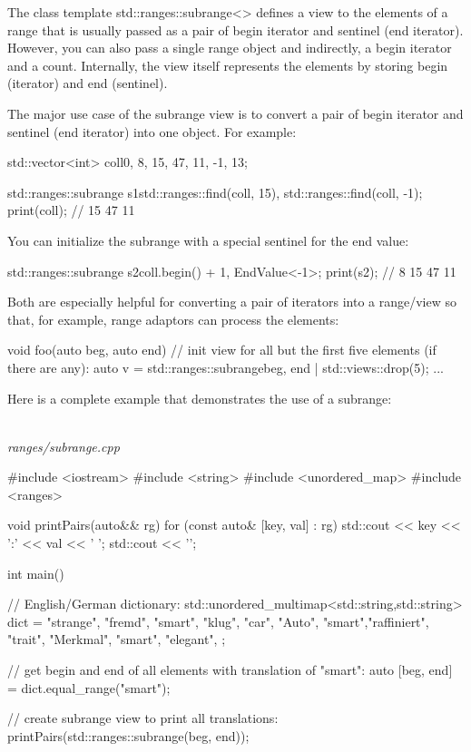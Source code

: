 The class template std::ranges::subrange<> defines a view to the elements of a range that is usually passed as a pair of begin iterator and sentinel (end iterator). However, you can also pass a single range object and indirectly, a begin iterator and a count. Internally, the view itself represents the elements by storing begin (iterator) and end (sentinel).

The major use case of the subrange view is to convert a pair of begin iterator and sentinel (end iterator) into one object. For example:

\begin{cpp}
std::vector<int> coll{0, 8, 15, 47, 11, -1, 13};

std::ranges::subrange s1{std::ranges::find(coll, 15),
						std::ranges::find(coll, -1)};
print(coll); // 15 47 11
\end{cpp}

You can initialize the subrange with a special sentinel for the end value:

\begin{cpp}
std::ranges::subrange s2{coll.begin() + 1, EndValue<-1>{}};
print(s2); // 8 15 47 11
\end{cpp}

Both are especially helpful for converting a pair of iterators into a range/view so that, for example, range adaptors can process the elements:

\begin{cpp}
void foo(auto beg, auto end)
{
	// init view for all but the first five elements (if there are any):
	auto v = std::ranges::subrange{beg, end} | std::views::drop(5);
	...
}
\end{cpp}

Here is a complete example that demonstrates the use of a subrange:

\noindent
\hspace*{\fill} \\ %
\textit{ranges/subrange.cpp}

\begin{cpp}
#include <iostream>
#include <string>
#include <unordered_map>
#include <ranges>

void printPairs(auto&& rg)
{
	for (const auto& [key, val] : rg) {
		std::cout << key << ':' << val << ' ';
	}
	std::cout << '\n';
}

int main()
{
	// English/German dictionary:
	std::unordered_multimap<std::string,std::string> dict = {
		{"strange", "fremd"},
		{"smart", "klug"},
		{"car", "Auto"},
		{"smart","raffiniert"},
		{"trait", "Merkmal"},
		{"smart", "elegant"},
	};
	
	// get begin and end of all elements with translation of "smart":
	auto [beg, end] = dict.equal_range("smart");
	
	// create subrange view to print all translations:
	printPairs(std::ranges::subrange(beg, end));
}
\end{cpp}

